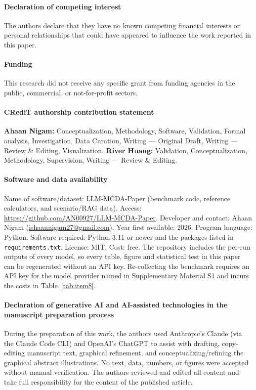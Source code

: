 \documentclass[final,3p,times]{elsarticle}
\begin{document}
\clearpage

\paragraph*{Declaration of competing interest}
The authors declare that they have no known competing financial interests or personal relationships that could have appeared to influence the work reported in this paper.

\paragraph*{Funding}
This research did not receive any specific grant from funding agencies in the public, commercial, or not-for-profit sectors.

\paragraph*{CRediT authorship contribution statement}
\textbf{Ahaan Nigam:} Conceptualization, Methodology, Software, Validation, Formal analysis, Investigation, Data Curation, Writing --- Original Draft, Writing --- Review \& Editing, Visualization. \textbf{River Huang:} Validation, Conceptualization, Methodology, Supervision, Writing --- Review \& Editing.

\paragraph*{Software and data availability}
Name of software/dataset: LLM-MCDA-Paper (benchmark code, reference calculators, and scenario/RAG data). Access: \url{https://github.com/AN00927/LLM-MCDA-Paper}.
Developer and contact: Ahaan Nigam (\href{mailto:ishaannigam27@gmail.com}{ishaannigam27@gmail.com}). 
Year first available: 2026. 
Program language: Python.
Software required: Python 3.11 or newer and the packages listed in \texttt{requirements.txt}.
License: MIT. Cost: free.
The repository includes the per-run outputs of every model, so every table, figure and statistical test in this paper can be regenerated without an API key. Re-collecting the benchmark requires an API key for the model provider named in Supplementary Material S1 and incurs the costs in Table~\ref{tab:item8}.

\paragraph*{Declaration of generative AI and AI-assisted technologies in the manuscript preparation process}
During the preparation of this work, the authors used Anthropic's Claude (via the Claude Code CLI) and OpenAI's ChatGPT to assist with drafting, copy-editing manuscript text, graphical refinement, and conceptualizing/refining the graphical abstract illustrations. No text, data, numbers, or figures were accepted without manual verification. The authors reviewed and edited all content and take full responsibility for the content of the published article.
\end{document}
